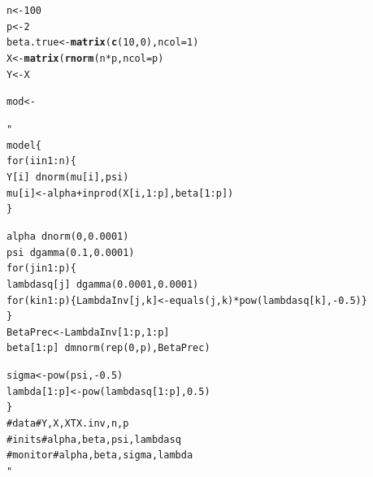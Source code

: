 \documentclass[]{beamer}\usepackage[]{graphicx}\usepackage[]{color}
\makeatletter
\newcommand{\hlstr}[1]{\textcolor[rgb]{0.192,0.494,0.8}{#1}}%
\newcommand{\hlstd}[1]{\textcolor[rgb]{0.345,0.345,0.345}{#1}}%
\newcommand{\hlkwb}[1]{\textcolor[rgb]{0.69,0.353,0.396}{#1}}%
\newcommand{\hlkwd}[1]{\textcolor[rgb]{0.737,0.353,0.396}{\textbf{#1}}}%
\newenvironment{kframe}{%
 \def\at@end@of@kframe{}%
 \ifinner\ifhmode%
  \def\at@end@of@kframe{\end{minipage}}%
  \begin{minipage}{\columnwidth}%
 \fi\fi%
 \def\FrameCommand##1{\hskip\@totalleftmargin \hskip-\fboxsep
 \colorbox{shadecolor}{##1}\hskip-\fboxsep
     \hskip-\linewidth \hskip-\@totalleftmargin \hskip\columnwidth}%
 \MakeFramed {\advance\hsize-\width
   \@totalleftmargin\z@ \linewidth\hsize
   \@setminipage}}%
 {\par\unskip\endMakeFramed%
 \at@end@of@kframe}
\newenvironment{knitrout}{}{} %
\makeatother
\begin{document}
\newsavebox{\ipriorjagsforshow}
\begin{lrbox}{\ipriorjagsforshow}
\begin{knitrout}\small
{}\color{fgcolor}\begin{kframe}
\begin{alltt}
n <- 100
p <- 2
beta.true <- \hlkwd{matrix}(\hlkwd{c}(10, 0), ncol = 1)
X <- \hlkwd{matrix}(\hlkwd{rnorm}(n * p, ncol = p)
Y <- X %
\end{alltt}
\end{kframe}
\end{knitrout}
\end{lrbox}



\newsavebox{\ipriorjagsb}
\begin{lrbox}{\ipriorjagsb}
\begin{knitrout}\scriptsize
{}\color{fgcolor}\begin{kframe}
\begin{alltt}
\hlstd{mod} \hlkwb{<-} \hlstr{"
  model \{
    for (i in 1:n) \{  
      Y[i] ~ dnorm(mu[i], psi)  
      mu[i] <- alpha + inprod(X[i,1:p], beta[1:p])  
    \}
  
    alpha ~ dnorm(0, 0.0001)
    psi ~ dgamma(0.1, 0.0001)
    for (j in 1:p) \{ 
      lambdasq[j] ~ dgamma(0.0001, 0.0001)
      for (k in 1:p) \{ LambdaInv[j, k] <- equals(j,k) * pow(lambdasq[k], -0.5) \}
    \}  
    BetaPrec <- LambdaInv[1:p, 1:p] %
    beta[1:p] ~ dmnorm(rep(0, p), BetaPrec)  
    
    sigma <- pow(psi, -0.5)
    lambda[1:p] <- pow(lambdasq[1:p], 0.5)
  \}
  #data# Y, X, XTX.inv, n, p
  #inits# alpha, beta, psi, lambdasq
  #monitor# alpha, beta, sigma, lambda
"}
\end{alltt}
\end{kframe}
\end{knitrout}
\end{lrbox}
\end{document}
